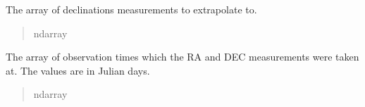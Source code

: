 \documentclass[letterpaper,11pt,english]{sphinxmanual}
\begin{document}
\begin{savenotes}
\begin{fulllineitems}
\begin{savenotes}
\begin{fulllineitems}
\begin{quote}
\begin{description}
\end{description}\end{quote}

\end{fulllineitems}\end{savenotes}


\begin{savenotes}\begin{fulllineitems}
\label{\detokenize{code/opihiexarata.propagate.polynomial:opihiexarata.propagate.polynomial.LinearPropagationEngine.dec_array}}
\pysigstartsignatures
{}
\pysigstopsignatures
\sphinxAtStartPar
The array of declinations measurements to extrapolate to.
\begin{quote}\begin{description}
\sphinxAtStartPar
ndarray

\end{description}\end{quote}

\end{fulllineitems}\end{savenotes}


\begin{savenotes}\begin{fulllineitems}
\label{\detokenize{code/opihiexarata.propagate.polynomial:opihiexarata.propagate.polynomial.LinearPropagationEngine.obs_time_array}}
\pysigstartsignatures
{}
\pysigstopsignatures
\sphinxAtStartPar
The array of observation times which the RA and DEC measurements were
taken at. The values are in Julian days.
\begin{quote}\begin{description}
\sphinxAtStartPar
ndarray

\end{description}\end{quote}

\end{fulllineitems}\end{savenotes}


\end{fulllineitems}
\end{savenotes}
\end{document}
